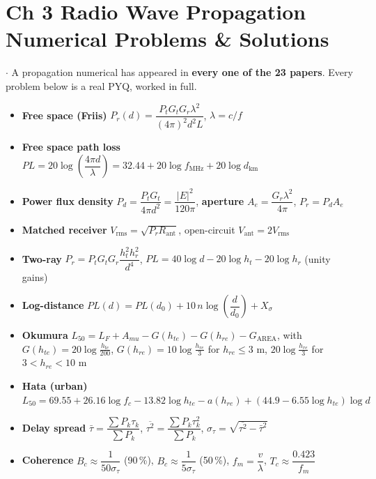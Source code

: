 \section*{\color{acc}Ch 3 \textperiodcentered{} Radio Wave Propagation \gap
\textcolor{sub}{Numerical Problems \& Solutions}}
\vspace{-4pt}{\color{acc}\rule{\textwidth}{1.1pt}}\vspace{4pt}

{\color{sub}\footnotesize {} \gap$\cdot$\gap {}
A propagation numerical has appeared in \textbf{every one of the 23 papers}.
Every problem below is a real PYQ, worked in full.}

\begin{itemize}
  \item \textbf{Free space (Friis)} \;
        $P_r(d) = \dfrac{P_t G_t G_r \lambda^2}{(4\pi)^2 d^2 L}$, \qquad $\lambda = c/f$
  \item \textbf{Free space path loss} \;
        $PL = 20\log\!\left(\dfrac{4\pi d}{\lambda}\right)
            = 32.44 + 20\log f_{\text{MHz}} + 20\log d_{\text{km}}$
  \item \textbf{Power flux density} \; $P_d = \dfrac{P_t G_t}{4\pi d^2} = \dfrac{|E|^2}{120\pi}$,
        \qquad \textbf{aperture} \; $A_e = \dfrac{G_r\lambda^2}{4\pi}$, \qquad $P_r = P_d A_e$
  \item \textbf{Matched receiver} \; $V_{\text{rms}} = \sqrt{P_r R_{\text{ant}}}$, \;
        open-circuit $V_{\text{ant}} = 2V_{\text{rms}}$
  \item \textbf{Two-ray} \; $P_r = P_t G_t G_r \dfrac{h_t^2 h_r^2}{d^4}$, \;
        $PL = 40\log d - 20\log h_t - 20\log h_r$ (unity gains)
  \item \textbf{Log-distance} \;
        $PL(d) = PL(d_0) + 10\,n\log\!\left(\dfrac{d}{d_0}\right) + X_\sigma$
  \item \textbf{Okumura} \; $L_{50} = L_F + A_{mu} - G(h_{te}) - G(h_{re}) - G_{\text{AREA}}$,
        with $G(h_{te}) = 20\log\frac{h_{te}}{200}$, \;
        $G(h_{re}) = 10\log\frac{h_{re}}{3}$ for $h_{re}\le 3$ m, \;
        $20\log\frac{h_{re}}{3}$ for $3 < h_{re} < 10$ m
  \item \textbf{Hata (urban)} \;
        $L_{50} = 69.55 + 26.16\log f_c - 13.82\log h_{te} - a(h_{re})
                  + (44.9 - 6.55\log h_{te})\log d$
  \item \textbf{Delay spread} \;
        $\bar{\tau} = \dfrac{\sum P_k \tau_k}{\sum P_k}$, \;
        $\overline{\tau^2} = \dfrac{\sum P_k \tau_k^2}{\sum P_k}$, \;
        $\sigma_\tau = \sqrt{\overline{\tau^2} - \bar{\tau}^2}$
  \item \textbf{Coherence} \; $B_c \approx \dfrac{1}{50\sigma_\tau}$ (90\,\%), \;
        $B_c \approx \dfrac{1}{5\sigma_\tau}$ (50\,\%), \;
        $f_m = \dfrac{v}{\lambda}$, \; $T_c \approx \dfrac{0.423}{f_m}$
\end{itemize}

